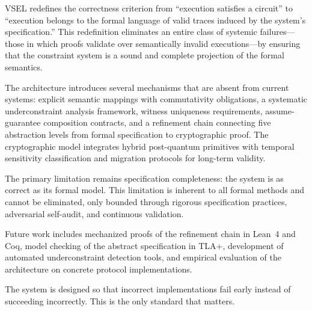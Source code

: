 \documentclass[11pt,a4paper]{article}
\theoremstyle{definition}
\begin{document}
VSEL redefines the correctness criterion from ``execution satisfies a circuit'' to ``execution belongs to the formal language of valid traces induced by the system's specification.'' This redefinition eliminates an entire class of systemic failures---those in which proofs validate over semantically invalid executions---by ensuring that the constraint system is a sound and complete projection of the formal semantics.

The architecture introduces several mechanisms that are absent from current systems: explicit semantic mappings with commutativity obligations, a systematic underconstraint analysis framework, witness uniqueness requirements, assume-guarantee composition contracts, and a refinement chain connecting five abstraction levels from formal specification to cryptographic proof. The cryptographic model integrates hybrid post-quantum primitives with temporal sensitivity classification and migration protocols for long-term validity.

The primary limitation remains specification completeness: the system is as correct as its formal model. This limitation is inherent to all formal methods and cannot be eliminated, only bounded through rigorous specification practices, adversarial self-audit, and continuous validation.

Future work includes mechanized proofs of the refinement chain in Lean~4 and Coq, model checking of the abstract specification in TLA+, development of automated underconstraint detection tools, and empirical evaluation of the architecture on concrete protocol implementations.

The system is designed so that incorrect implementations fail early instead of succeeding incorrectly. This is the only standard that matters.


\end{document}
